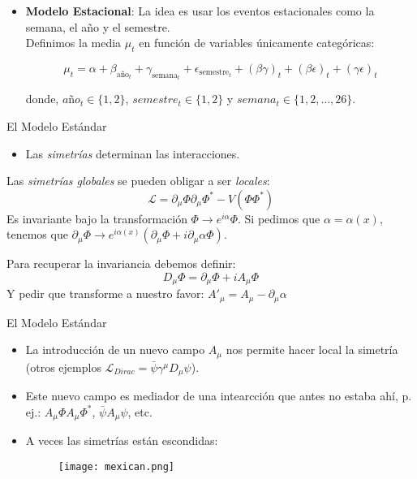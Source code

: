 \documentclass{beamer}
\begin{document}
\begin{frame}{}
 \begin{itemize}
   \item
   {\bf{Modelo Estacional}}: La idea es usar los eventos estacionales como la semana, el año y el semestre. \\

Definimos la media $\mu_t$ en función de variables únicamente categóricas: 
\begin{exampleblock}{}
\[
 \mu_t = \alpha +  \beta_{\text{año}_t}  + \gamma_{\text{semana}_t} + \epsilon_{\text{semestre}_t} +  (\beta \gamma)_t + ( \beta \epsilon)_t + (\gamma \epsilon)_t
\]
\end{exampleblock}

donde, $\textit{año}_t \in \{ 1, 2\}$,  $\textit{semestre}_t \in \{ 1, 2\}$ y $\textit{semana}_t \in \{ 1, 2, \dots , 26\}$.    

  \end{itemize}
\end{frame}



\begin{frame}{El Modelo Estándar}
 \begin{itemize}
  \item
    Las \textit{simetrías} determinan las interacciones.
   \end{itemize} 
    \begin{exampleblock}{}
     Las {\textit{simetrías globales}} se pueden obligar a ser \textit{locales}: 
\[
\mathcal{L} = \partial_{\mu}\Phi \partial_{\mu}\Phi^* - V(\Phi \Phi^*)
\]
Es invariante bajo la transformación $\Phi \to e^{i\alpha} \Phi$. 
Si pedimos que $\alpha = \alpha(x)$, tenemos que $\partial_{\mu}\Phi \to e^{i \alpha(x)} (\partial_{\mu}\Phi +  i \partial_{\mu} \alpha \Phi)$.
\end{exampleblock}
 \begin{exampleblock}{}
Para recuperar la invariancia debemos definir:
\[
D_{\mu}\Phi = \partial_{\mu} \Phi +  i A_{\mu} \Phi
\]
Y pedir que transforme a nuestro favor: $A'_{\mu} = A_{\mu} - \partial_{\mu} \alpha $ 
\end{exampleblock}
\end{frame}


\begin{frame}{El Modelo Estándar}

\begin{itemize}
  \item
    La introducción de un nuevo campo $A_{\mu}$ nos permite hacer local la simetría (otros ejemplos $\mathcal{L}_{Dirac} = \bar{\psi} \gamma^{\mu} D_{\mu} \psi$). 
    \item Este nuevo campo es mediador de una intearcción que antes no estaba ahí, p. ej.: $A_{\mu}\Phi A_{\mu} \Phi^*$, $\bar{\psi} A_{\mu} \psi$, etc.
    \item A veces las simetrías están escondidas:
\begin{figure}
\texttt{[image: mexican.png]}
\end{figure}
   \end{itemize} 
\end{frame}
\end{document}
